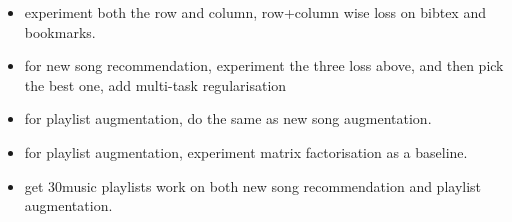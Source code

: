 \TODO

\begin{itemize}
\item experiment both the row and column, row+column  wise loss on bibtex and bookmarks.
\item for new song recommendation, experiment the three loss above, and then pick the best one, add multi-task regularisation
\item for playlist augmentation, do the same as new song augmentation.
\item for playlist augmentation, experiment matrix factorisation as a baseline.
\item get 30music playlists work on both new song recommendation and playlist augmentation.
\end{itemize}
